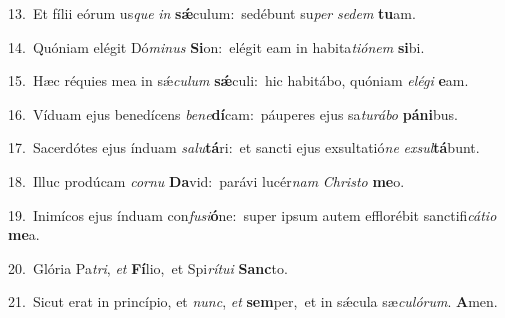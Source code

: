 {\numbfont\textcolor{\numbcolor}{13.}}~Et fílii eórum us\textit{que} \textit{in} \textbf{sǽ}\-culum:~\star sedébunt su\textit{per} \textit{se}\-\textit{dem} \textbf{tu}\-am.\par
{\numbfont\textcolor{\numbcolor}{14.}}~Quóniam elégit Dó\-\textit{mi}\-\textit{nus} \textbf{Si}\-on:~\star elégit eam in habita\-\textit{ti}\-\textit{ó}\textit{nem} \textbf{si}\-bi.\par
{\numbfont\textcolor{\numbcolor}{15.}}~Hæc réquies mea in sǽ\-\textit{cu}\-\textit{lum} \textbf{sǽ}\-culi:~\star hic habitábo, quóniam \textit{e}\-\textit{lé}\textit{gi} \textbf{e}\-am.\par
{\numbfont\textcolor{\numbcolor}{16.}}~Víduam ejus benedícens \textit{be}\-\textit{ne}\textbf{dí}cam:~\star páuperes ejus sa\-\textit{tu}\-\textit{rá}\textit{bo} \textbf{pá}\-\textbf{ni}bus.\par
{\numbfont\textcolor{\numbcolor}{17.}}~Sacerdótes ejus índuam \textit{sa}\-\textit{lu}\textbf{tá}ri:~\star et sancti ejus exsultatió\textit{ne} \textit{ex}\-\textit{sul}\textbf{tá}bunt.\par
{\numbfont\textcolor{\numbcolor}{18.}}~Illuc prodúcam \textit{cor}\-\textit{nu} \textbf{Da}\-vid:~\star parávi lucér\textit{nam} \textit{Chris}\-\textit{to} \textbf{me}\-o.\par
{\numbfont\textcolor{\numbcolor}{19.}}~Inimícos ejus índuam con\-\textit{fu}\-\textit{si}\textbf{ó}ne:~\star super ipsum autem efflorébit sanctifi\-\textit{cá}\-\textit{ti}\textit{o} \textbf{me}\-a.\par
{\numbfont\textcolor{\numbcolor}{20.}}~Glória Pa\-\textit{tri}\-, \textit{et} \textbf{Fí}\-lio,~\star et Spi\-\textit{rí}\-\textit{tu}\textit{i} \textbf{Sanc}\-to.\par
{\numbfont\textcolor{\numbcolor}{21.}}~Sicut erat in princípio, et \textit{nunc}\-, \textit{et} \textbf{sem}\-per,~\star et in sǽcula sæ\-\textit{cu}\-\textit{ló}\textit{rum}. \textbf{A}\-men.\par
